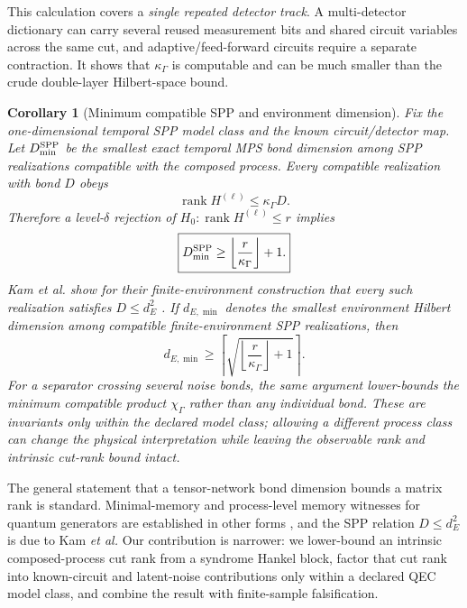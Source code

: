 \documentclass[11pt]{article}
\newtheorem{corollary}[theorem]{Corollary}
\newcommand{\rank}{\operatorname{rank}}
\begin{document}
This calculation covers a \emph{single repeated detector track}. A multi-detector dictionary can carry several reused measurement bits and shared circuit variables across the same cut, and adaptive/feed-forward circuits require a separate contraction. It shows that $\kappa_\Gamma$ is computable and can be much smaller than the crude double-layer Hilbert-space bound.

\begin{corollary}[Minimum compatible SPP and environment dimension]
\label{cor:spp}
Fix the one-dimensional temporal SPP model class and the known circuit/detector map. Let $D_{\min}^{\rm SPP}$ be the smallest exact temporal MPS bond dimension among SPP realizations compatible with the composed process. Every compatible realization with bond $D$ obeys
\begin{equation}
    \rank H^{(\ell)}\le \kappa_\Gamma D.
    \label{eq:sppbound}
\end{equation}
Therefore a level-$\delta$ rejection of $H_0:\rank H^{(\ell)}\le r$ implies
\begin{equation}
    \boxed{D_{\min}^{\rm SPP}\ge
    \left\lfloor\frac{r}{\kappa_\Gamma}\right\rfloor+1.}
    \label{eq:dminlower}
\end{equation}
Kam \emph{et al.} show for their finite-environment construction that every such realization satisfies $D\le d_E^2$ \cite{kam2026spp}. If $d_{E,\min}$ denotes the smallest environment Hilbert dimension among compatible finite-environment SPP realizations, then
\begin{equation}
    \boxed{d_{E,\min}\ge
    \left\lceil
    \sqrt{\left\lfloor\frac{r}{\kappa_\Gamma}\right\rfloor+1}
    \right\rceil.}
    \label{eq:envlower}
\end{equation}
For a separator crossing several noise bonds, the same argument lower-bounds the minimum compatible product $\chi_\Gamma$ rather than any individual bond. These are invariants only \emph{within the declared model class}; allowing a different process class can change the physical interpretation while leaving the observable rank and intrinsic cut-rank bound intact.
\end{corollary}

The general statement that a tensor-network bond dimension bounds a matrix rank is standard. Minimal-memory and process-level memory witnesses for quantum generators are established in other forms \cite{bisio2011memory,guo2022memory,zonnios2024memory}, and the SPP relation $D\le d_E^2$ is due to Kam \emph{et al.} Our contribution is narrower: we lower-bound an intrinsic composed-process cut rank from a syndrome Hankel block, factor that cut rank into known-circuit and latent-noise contributions only within a declared QEC model class, and combine the result with finite-sample falsification.
\end{document}
